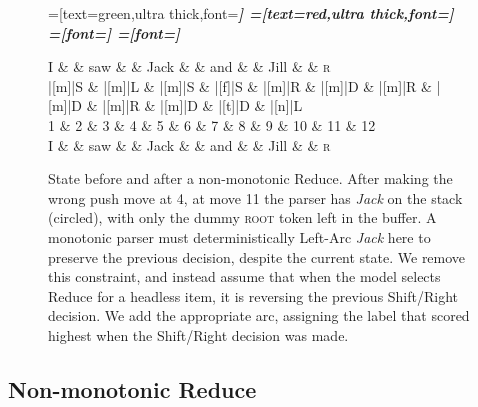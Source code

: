 \documentclass[11pt,letterpaper]{article}
\begin{document}
\begin{figure}
    \centering
    \begin{dependency}[theme=simple]
    =[text=green,ultra thick,font=\bfseries\itshape]
    =[text=red,ultra thick,font=\bfseries\itshape]
    =[font=\bfseries\itshape]
    =[font=\itshape]
    \begin{deptext}[column sep=.075cm, row sep=.1ex]
        I \&           \& saw \&          \& Jack       \& \& and     \&           \& Jill \&   \& \textsc{r} \\
       |[m]|S \& |[m]|L \& |[m]|S   \& |[f]|S \& |[m]|R \& |[m]|D \& |[m]|R \& |[m]|D \& |[m]|R \& |[m]|D \& |[t]|D \& |[n]|L \\
            1 \&     2       \& 3  \&   4      \& 5          \& 6 \& 7     \& 8 \& 9 \& 10 \& 11 \& 12 \\
            I \&           \& saw \&          \& Jack       \& \& and     \&           \& Jill \& \& \textsc{r} \\
\end{deptext}
    
    
\end{dependency}
\caption{
    \small
State before and after a non-monotonic Reduce.
After making the wrong push move at 4, at move 11
the parser has \emph{Jack} on the stack (circled), with only the dummy \textsc{root}
token left in the buffer. A monotonic parser must deterministically Left-Arc
\emph{Jack} here to preserve the previous decision, despite the current state.
We remove this constraint, and instead assume that when the model selects Reduce
for a headless item, it is reversing the previous Shift/Right decision. We add
the appropriate arc, assigning the label that scored highest when the Shift/Right
decision was made.
\label{fig:adduce}}
\vspace{-0.5\baselineskip}
\end{figure}


\subsection{Non-monotonic Reduce}
\end{document}
